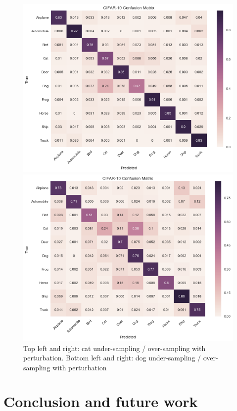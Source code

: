 \documentclass[runningheads,a4paper]{llncs}
\begin{document}
\begin{figure}
\begin{minipage}[b]{0.5\linewidth}
		\includegraphics[width=1\linewidth]{dog_undersampling_per.png} 
	\end{minipage}%
	\begin{minipage}[b]{0.5\linewidth}
		\centering
		\includegraphics[width=1\linewidth]{dog_oversampling_per.png} 
	\end{minipage} 
	\centering
	\caption{Top left and right: cat under-sampling / over-sampling with perturbation. Bottom left and right: dog under-sampling / over-sampling with perturbation}
	\label{fig:overlap}
\end{figure}
\section{Conclusion and future work}
\end{document}
